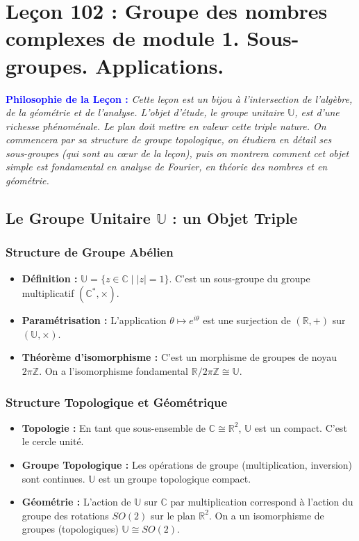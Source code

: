\documentclass[12pt, a4paper, parskip=full]{report}
\theoremstyle{agregstyle}
\newenvironment{philosophie}
  {\par\medskip\noindent\begin{oframed}\noindent\textbf{\textcolor{blue}{Philosophie de la Leçon :}}\itshape}
  {\end{oframed}\par\medskip}
\begin{document}
\chapter{Leçon 102 : Groupe des nombres complexes de module 1. Sous-groupes. Applications.}

\begin{philosophie}
    Cette leçon est un bijou à l'intersection de l'algèbre, de la géométrie et de l'analyse. L'objet d'étude, le groupe unitaire $\mathbb{U}$, est d'une richesse phénoménale. Le plan doit mettre en valeur cette triple nature. On commencera par sa structure de groupe topologique, on étudiera en détail ses sous-groupes (qui sont au cœur de la leçon), puis on montrera comment cet objet simple est fondamental en analyse de Fourier, en théorie des nombres et en géométrie.
\end{philosophie}

\section{Le Groupe Unitaire $\mathbb{U}$ : un Objet Triple}

\subsection{Structure de Groupe Abélien}
\begin{itemize}
    \item \textbf{Définition :} $\mathbb{U} = \{ z \in \mathbb{C} \mid |z|=1 \}$. C'est un sous-groupe du groupe multiplicatif $(\mathbb{C}^*, \times)$.
    \item \textbf{Paramétrisation :} L'application $\theta \mapsto e^{i\theta}$ est une surjection de $(\mathbb{R}, +)$ sur $(\mathbb{U}, \times)$.
    \item \textbf{Théorème d'isomorphisme :} C'est un morphisme de groupes de noyau $2\pi\mathbb{Z}$. On a l'isomorphisme fondamental $\mathbb{R}/2\pi\mathbb{Z} \cong \mathbb{U}$.
\end{itemize}

\subsection{Structure Topologique et Géométrique}
\begin{itemize}
    \item \textbf{Topologie :} En tant que sous-ensemble de $\mathbb{C} \cong \mathbb{R}^2$, $\mathbb{U}$ est un compact. C'est le cercle unité.
    \item \textbf{Groupe Topologique :} Les opérations de groupe (multiplication, inversion) sont continues. $\mathbb{U}$ est un groupe topologique compact.
    \item \textbf{Géométrie :} L'action de $\mathbb{U}$ sur $\mathbb{C}$ par multiplication correspond à l'action du groupe des rotations $SO(2)$ sur le plan $\mathbb{R}^2$. On a un isomorphisme de groupes (topologiques) $\mathbb{U} \cong SO(2)$.
\end{itemize}
\end{document}
